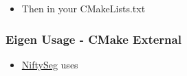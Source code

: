 \begin{itemize}
\itemsep1pt\parskip0pt
\item
  Then in your CMakeLists.txt
\end{itemize}

\begin{Shaded}
\begin{Highlighting}[]
\NormalTok{(} \NormalTok{)}
\NormalTok{(}\NormalTok{)}
\end{Highlighting}
\end{Shaded}

\subsubsection{Eigen Usage - CMake
External}\label{eigen-usage---cmake-external}

\begin{itemize}
\itemsep1pt\parskip0pt
\item
  \href{http://sourceforge.net/projects/niftyseg/}{NiftySeg} uses
\end{itemize}

